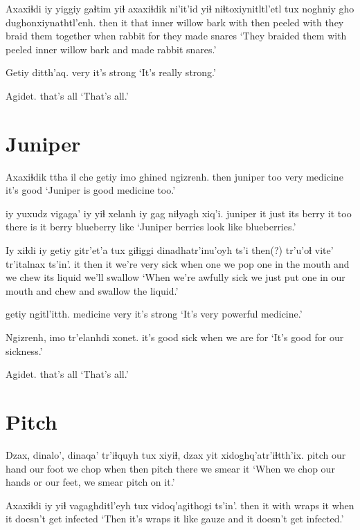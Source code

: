 \documentclass[12pt]{article}
\begin{document}
\gll Axaxiɬdi iy yiggiy gaɬtim yiɬ axaxiɬdik ni'it'id yiɬ niɬtoxiynitltl'etl tux noghniy gho dughonxiynathtl'enh.
then     it that   {inner willow bark} with then {peeled} with {they braid them together} when rabbit for {they made snares}
\glt `They braided them with peeled inner willow bark and made rabbit snares.'
\glend

\gll Getiy ditth'aq.
very {it's strong}
\glt `It's really strong.'
\glend

\gll Agidet.
{{that's all}}
\glt `That's all.'
\glend

\section{Juniper}

\gll Axaxiɬdik {ttha il} che getiy {imo ghined} ngizrenh.
then       juniper  too very  medicine     {it's good}
\glt `Juniper is good medicine too.'
\glend

 iy yuxudz vigaga' iy yiɬ xelanh iy gag niɬyagh xiq'i.
juniper   it just   {its berry} it too {there is} it berry blueberry like
\glt `Juniper berries look like blueberries.'
\glend

\gll Iy xiɬdi iy {getiy gitr'et'a} tux  giɬiggi dinadhatr'inu'oyh ts'i then(?) tr'u'oɬ vite' tr'italnax ts'in'.
it then  it {we're very sick} when one     {we pop one in the mouth}  and {} {we chew} {its liquid} {we'll swallow} 
\glt `When we're awfully sick we just put one in our mouth and chew and swallow the liquid.'
\glend

 getiy ngitl'itth.
medicine   very {it's strong}
\glt `It's very powerful medicine.'
\glend

\gll Ngizrenh, imo tr'elanhdi xonet.
{it's good} sick {when we are} for
\glt `It's good for our sickness.'
\glend

\gll Agidet.
{{that's all}}
\glt `That's all.'
\glend

\section{Pitch}
 
\gll Dzax, dinalo', dinaqa' tr'iɬquyh tux xiyiɬ, dzax yit xidoghq'atr'iɬtth'ix.
pitch {our hand} {our foot} {we chop} when then pitch there {we smear it}
\glt `When we chop our hands or our feet, we smear pitch on it.'
\glend

\gll Axaxiɬdi iy yiɬ vagaghditl'eyh tux {vidoq'agithogi ts'in'.}
then     it with {wraps it }          when {it doesn't get infected}
\glt `Then it's wraps it like gauze and it doesn't get infected.'
\glend
\end{document}
